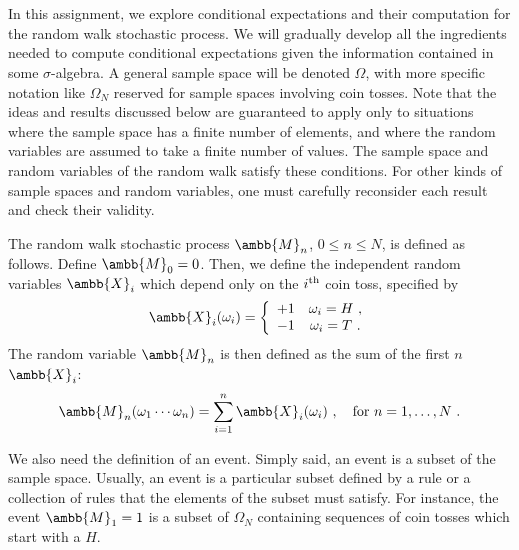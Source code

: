\documentclass[12pt]{article} %
\newcommand{\mX}{\ambb{X}}
\newcommand{\mM}{\ambb{M}}
\begin{document}
\thispagestyle{fancy} 


\section*{}

In this assignment, we explore conditional expectations and their
computation for the random walk stochastic process. We will gradually
develop all the ingredients needed to compute conditional expectations
given the information contained in some $\sigma$-algebra. A general
sample space will be denoted $\Omega$, with more specific notation
like $\Omega_N$ reserved for sample spaces involving coin tosses. Note
that the ideas and results discussed below are guaranteed to apply
only to situations where the sample space has a finite number of
elements, and where the random variables are assumed to take a finite
number of values. The sample space and random variables of the random
walk satisfy these conditions. For other kinds of sample spaces and
random variables, one must carefully reconsider each result and check
their validity.

The random walk stochastic process $\mM_n$, $0 \leq n \leq N$, is
defined as follows. Define $\mM_0 = 0$. Then, we define the
independent random variables $\mX_i$ which depend only on the
$i^{\rm th}$ coin toss, specified by
\begin{equation}
  \mX_i(\omega_i) = \left\{\begin{array}{cc} +1 & \omega_i = H\ , \\ -1 & \omega_i = T\ . \end{array}\right.
\end{equation}
The random variable $\mM_n$ is then defined as the sum of the first
$n$ $\mX_i$:
\begin{equation}
  \mM_n(\omega_1 \cdots \omega_n) = \sum_{i=1}^n \mX_i(\omega_i)\ ,\quad\text{for}\ n = 1,\ldots,N\ .
\end{equation}

We also need the definition of an event. Simply said, an event is a
subset of the sample space. Usually, an event is a particular subset
defined by a rule or a collection of rules that the elements of the
subset must satisfy. For instance, the event $\mM_1 = 1$ is a subset
of $\Omega_N$ containing sequences of coin tosses which start with a
$H$.
\end{document}
